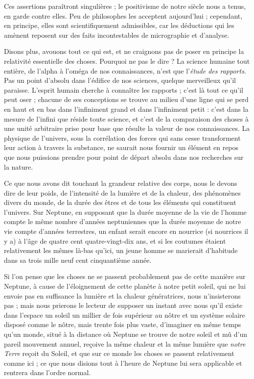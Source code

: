 \documentclass[a4paper, 11pt, oneside]{article}
\begin{document}
Ces assertions paraîtront singulières ; le positivisme de notre siècle nous a tenus, en garde contre elles. Peu de philosophes les acceptent aujourd'hui ; cependant, en principe, elles sont scientifiquement admissibles, car les déductions qui les amènent reposent sur des faits incontestables de micrographie et d'analyse.

Disons plus, avouons tout ce qui est, et ne craignons pas de poser en principe la relativité essentielle des choses. Pourquoi ne pas le dire ? La science humaine tout entière, de l'alpha à l'oméga de nos connaissances, n'est que l'\emph{étude des rapports}. Pas un point d'absolu dans l'édifice de nos sciences, quelque merveilleux qu'il paraisse. L'esprit humain cherche à connaître les rapports ; c'est là tout ce qu'il peut oser ; chacune de ses conceptions se trouve au milieu d'une ligne qui se perd en haut et en bas dans l'infiniment grand et dans l'infiniment petit : c'est dans la mesure de l'infini que réside toute science, et c'est de la comparaison des choses à une unité arbitraire prise pour base que résulte la valeur de nos connaissances. La physique de l'univers, sous la corrélation des forces qui sans cesse transforment leur action à travers la substance, ne saurait nous fournir un élément en repos que nous puissions prendre pour point de départ absolu dans nos recherches sur la nature.

Ce que nous avons dit touchant la grandeur relative des corps, nous le devons dire de leur poids, de l'intensité de la lumière et de la chaleur, des phénomènes divers du monde, de la durée des êtres et de tous les éléments qui constituent l'univers. Sur Neptune, en supposant que la durée moyenne de la vie de l'homme compte le même nombre d'années neptuniennes que la durée moyenne de notre vie compte d'années terrestres, un enfant serait encore en nourrice (si nourrices il y a) à l'âge de quatre cent quatre-vingt-dix ans, et si les coutumes étaient relativement les mêmes là-bas qu'ici, un jeune homme se marierait d'habitude dans sa trois mille neuf cent cinquantième année.

Si l'on pense que les choses ne se passent probablement pas de cette manière sur Neptune, à cause de l'éloignement de cette planète à notre petit soleil, qui ne lui envoie pas en suffisance la lumière et la chaleur génératrices, nous n'insisterons pas ; mais nous prierons le lecteur de supposer un instant avec nous qu'il existe dans l'espace un soleil un millier de fois supérieur au nôtre et un système solaire disposé comme le nôtre, mais trente fois plus vaste, d'imaginer en même temps qu'un monde, situé à la distance où Neptune se trouve de notre soleil et mû d'un pareil mouvement annuel, reçoive la même chaleur et la même lumière que \emph{notre Terre} reçoit du Soleil, et que sur ce monde les choses se passent relativement comme ici ; ce que nous disions tout à l'heure de Neptune lui sera applicable et rentrera dans l'ordre normal.
\end{document}

